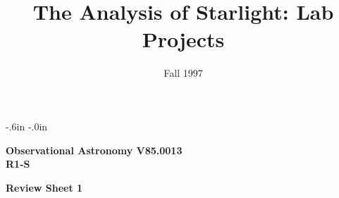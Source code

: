  
\topmargin -.6in 
\textheight 8.7in 
\oddsidemargin -.0in 
\textwidth 6.5in 
\title{The Analysis of Starlight: Lab Projects} 
\date{Fall 1997} 
 
\setcounter{page}{1} 
\setcounter{equation}{0} 
\pagestyle{empty} 
\parindent 0pt 
\parskip 8pt 
\def\arcsec{\ifmmode {^{\scriptscriptstyle\prime\prime}}
          \else $^{\scriptscriptstyle\prime\prime}$\fi}
\def\arcmin{\ifmmode {^{\scriptscriptstyle\prime}}
          \else $^{\scriptscriptstyle\prime}$\fi}
\def\deg{\ifmmode^\circ\else$^\circ$\fi}


   
 
\noindent 
{\bf Observational Astronomy      \hfill  V85.0013}\\ 
{\bf R1-S} 
 
\bigskip 
 
\bigskip 
 
\noindent 
{\hfill \Large {\bf Review Sheet 1} \hfill} 
 
 
\bigskip 

